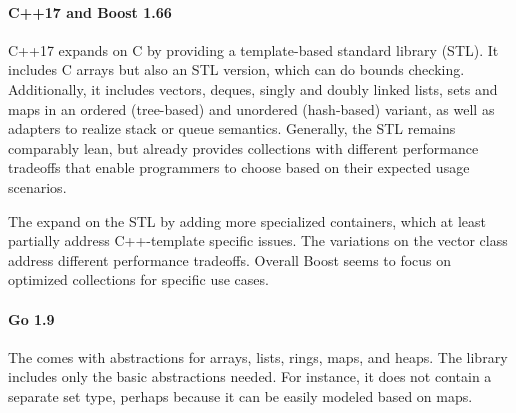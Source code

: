 \documentclass[sigconf, 10pt]{acmart}
\begin{document}
\paragraph{C++17 and Boost 1.66}

% 
% 

C++17\citep{Cpp17} expands on C
by providing a template-based standard library (STL).
It includes C arrays but also an STL version, which can do bounds checking.
Additionally, it includes vectors, deques, singly and doubly linked lists,
sets and maps in an ordered (tree-based) and unordered (hash-based) variant,
as well as adapters to realize stack or queue semantics.
Generally, the STL remains comparably lean,
but already provides collections with different performance tradeoffs
that enable programmers to choose based on their expected usage scenarios.

The 
expand on the STL by adding more specialized containers,
which at least partially address C++-template specific issues.
The variations on the vector class address different performance tradeoffs.
Overall Boost seems to focus on optimized collections
for specific use cases.

\paragraph{Go 1.9}


The 
comes with abstractions for arrays,
lists, rings, maps, and heaps.
The library includes only the basic abstractions needed.
For instance, it does not contain a separate set type,
perhaps because it can be easily modeled based on maps.
\end{document}
